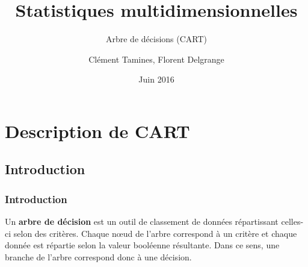 \documentclass[11pt]{beamer}
\author{Clément Tamines, Florent Delgrange}
\title{Statistiques multidimensionnelles}
\subtitle[\ldots]{Arbre de décisions (CART)}
\institute{UMONS\\Faculté des Sciences\\BA 3 Sciences Informatiques}
\date{Juin 2016}
\begin{document}
\begin{frame}
\titlepage
\end{frame}

\begin{frame}
\tableofcontents
\end{frame}

\section{Description de CART}
\subsection{Introduction}
\begin{frame}
\frametitle{Introduction}
Un \textbf{arbre de décision} est un outil de classement de données répartissant celles-ci selon des critères. Chaque nœud de l'arbre correspond à un critère et chaque donnée est répartie selon la valeur booléenne résultante. Dans ce sens, une branche de l'arbre correspond donc à une décision.
\end{frame}
\end{document}
